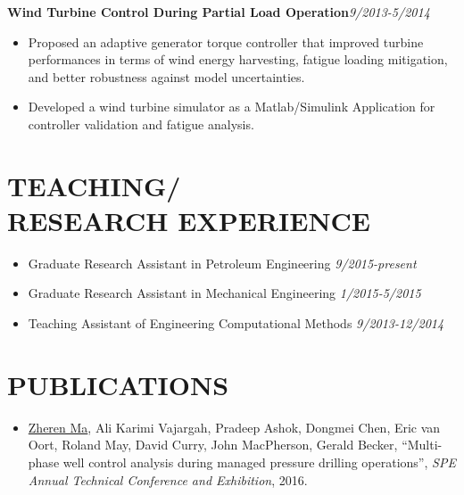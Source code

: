 \documentclass[margin, 9pt]{res}
\begin{document}
\begin{resume}
\medskip
{\textbf{Wind Turbine Control During Partial Load Operation}}\hfill\textit{9/2013-5/2014}\\
\vspace*{-10pt}
\begin{itemize}[leftmargin=*] \itemsep -3pt
\vspace*{-5pt}
	\item Proposed an adaptive generator torque controller that  improved turbine performances in terms of wind energy harvesting, fatigue loading mitigation, and better robustness against model uncertainties.
    \item Developed a wind turbine simulator as a Matlab/Simulink Application  for controller validation and fatigue analysis.
\end{itemize}


\section{TEACHING/\\RESEARCH EXPERIENCE}
\begin{itemize}[leftmargin=*] \itemsep -2pt
\vspace*{-2pt}
	\item Graduate Research Assistant in Petroleum Engineering \hfill\textit{9/2015-present}
	\item Graduate Research Assistant in Mechanical Engineering \hfill\textit{1/2015-5/2015}
	\item Teaching Assistant of Engineering Computational Methods \hfill\textit{9/2013-12/2014}
\end{itemize}


\section{PUBLICATIONS}
\begin{itemize}[leftmargin=*] \itemsep 0pt
\vspace*{-1pt}
    \item \underline{Zheren Ma}, Ali Karimi Vajargah, Pradeep Ashok, Dongmei Chen, Eric van Oort, Roland May, David Curry, John MacPherson, Gerald Becker,
        {``Multi-phase well control analysis during managed pressure drilling operations''},
       \textit{SPE Annual Technical Conference and Exhibition}, 2016.


\end{itemize}
\end{resume}
\end{document}

